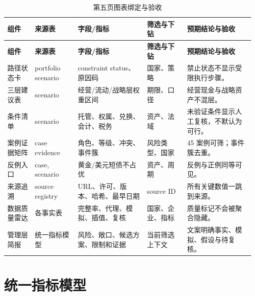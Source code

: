 \documentclass[UTF8,fontset=windows,12pt,openany]{ctexbook}
\begin{document}
\clearpage
\begin{landscape}
\begin{longtable}{p{3.3cm}p{3.6cm}p{4.4cm}p{3.1cm}p{4.5cm}}
\caption{第五页图表绑定与验收}\label{tab:page5-map}\\
\toprule
\textbf{组件} & \textbf{来源表} & \textbf{字段/指标} & \textbf{筛选与下钻} & \textbf{预期结论与验收}\\
\midrule
\endfirsthead
\toprule \textbf{组件} & \textbf{来源表} & \textbf{字段/指标} & \textbf{筛选与下钻} & \textbf{预期结论与验收}\\ \midrule
\endhead
路径状态卡 & portfolio scenario & constraint status、原因码 & 国家、策略 & 禁止状态不显示受限执行步骤。\\
三层建议表 & scenario & 经营/流动/战略层权重区间 & 期限、口径 & 经营现金与战略资产不混层。\\
条件清单 & scenario & 托管、权属、兑换、会计、税务 & 资产、法域 & 未验证条件显示人工复核，不默认为可行。\\
案例证据矩阵 & case evidence & 角色、等级、冲突、事件簇 & 风险类型、国家 & 45 案例可筛；事件簇去重。\\
反例入口 & case, scenario & 黄金/美元短债不占优 & 资产、周期 & 反例与正例同等可见。\\
来源追溯 & source registry & URL、许可、版本、哈希、最早日期 & source ID & 所有关键数值一跳到来源。\\
数据质量雷达 & 各事实表 & 完整率、代理、模拟、插值、复核 & 国家、企业、指标 & 质量标记不会被聚合隐藏。\\
管理层简报 & 统一指标模型 & 风险、敞口、候选方案、限制和证据 & 当前筛选上下文 & 文案明确事实、模拟、假设与待复核。\\
\bottomrule
\end{longtable}
\end{landscape}

\chapter{统一指标模型}
\end{document}
